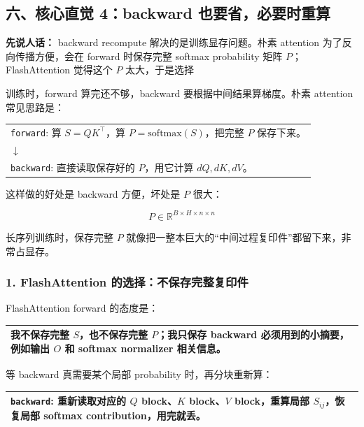\subsection{六、核心直觉 4：backward 也要省，必要时重算}

\begin{conceptbox}
\textbf{先说人话：} backward recompute 解决的是训练显存问题。朴素 attention 为了反向传播方便，会在 forward 时保存完整 softmax probability 矩阵 $P$；FlashAttention 觉得这个 $P$ 太大，于是选择
\end{conceptbox}

训练时，forward 算完还不够，backward 要根据中间结果算梯度。朴素 attention 常见思路是：

\begin{center}
\begin{tabular}{p{13.2cm}}
\hline
\texttt{forward}: 算 $S=QK^\top$，算 $P=\mathrm{softmax}(S)$，把完整 $P$ 保存下来。 \\
$\downarrow$ \\
\texttt{backward}: 直接读取保存好的 $P$，用它计算 $dQ,dK,dV$。 \\
\hline
\end{tabular}
\end{center}

这样做的好处是 backward 方便，坏处是 $P$ 很大：

\[
P\in \mathbb{R}^{B\times H\times n\times n}
\]

长序列训练时，保存完整 $P$ 就像把一整本巨大的“中间过程复印件”都留下来，非常占显存。

\subsubsection*{1. FlashAttention 的选择：不保存完整复印件}

FlashAttention forward 的态度是：

\begin{center}
\begin{tabular}{p{13.2cm}}
\hline
我不保存完整 $S$，也不保存完整 $P$；我只保存 backward 必须用到的小摘要，例如输出 $O$ 和 softmax normalizer 相关信息。 \\
\hline
\end{tabular}
\end{center}

等 backward 真需要某个局部 probability 时，再分块重新算：

\begin{center}
\begin{tabular}{p{13.2cm}}
\hline
\texttt{backward}: 重新读取对应的 $Q$ block、$K$ block、$V$ block，重算局部 $S_{ij}$，恢复局部 softmax contribution，用完就丢。 \\
\hline
\end{tabular}
\end{center}

